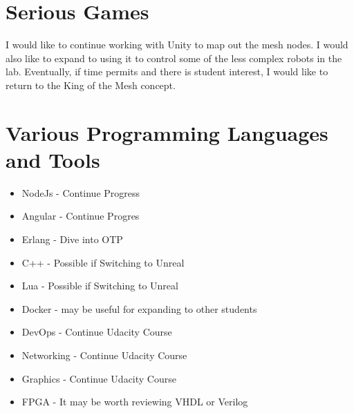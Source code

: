 \documentclass{IEEEtran}
\begin{document}
\section{Serious Games}

I would like to continue working with Unity to map out the mesh nodes. I 
would also like to expand to using it to control some of the less complex
robots in the lab. Eventually, if time permits and there is student interest,
I would like to return to the King of the Mesh concept. 

\section{Various Programming Languages and Tools}

\begin{itemize}
	\item NodeJs - Continue Progress
	\item Angular - Continue Progres
	\item Erlang - Dive into OTP
	\item C++ - Possible if Switching to Unreal
	\item Lua - Possible if Switching to Unreal
	\item Docker - may be useful for expanding to other students
	\item DevOps - Continue Udacity Course
	\item Networking - Continue Udacity Course
	\item Graphics - Continue Udacity Course
	\item FPGA - It may be worth reviewing VHDL or Verilog
\end{itemize}
\end{document}
